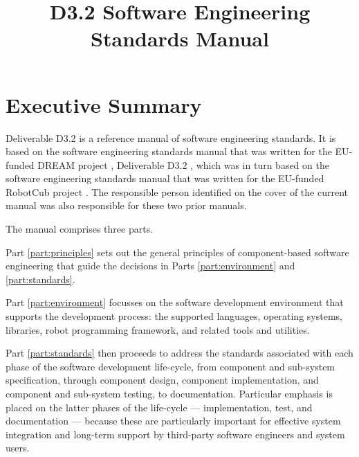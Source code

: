 \documentclass{CSSRforAfrica}
\begin{document}



\title{D3.2 Software Engineering Standards Manual}

\partner{}                          




\maketitle
 

\section*{Executive Summary}
\label{executive_summary}
 
Deliverable D3.2 is a reference manual of software engineering standards. 
It is based on the software engineering standards manual that was written for the EU-funded DREAM project \cite{DREAM}, Deliverable D3.2 \cite{DREAM3.2}, which was in turn based on the software engineering standards manual that was written for the EU-funded RobotCub project \cite{robotcub}. The responsible person identified on the cover of the current manual was also responsible for these two prior manuals.  

The manual comprises three parts.  

Part \ref{part:principles} sets out  the general principles of component-based software engineering that guide the decisions in Parts \ref{part:environment} and \ref{part:standards}.

Part \ref{part:environment}  focusses on the software development environment that supports the development process: the supported languages, operating systems, libraries, robot programming framework, and related tools and utilities.

Part \ref{part:standards} then proceeds to address the standards associated with each phase of the software development life-cycle, from component and sub-system specification, through component design, component implementation, and component and sub-system testing, to documentation.   Particular emphasis is placed on the latter phases of the life-cycle --- implementation, test, and documentation --- because these are particularly important for effective system integration and long-term support by third-party software  engineers and system users.
\end{document}
